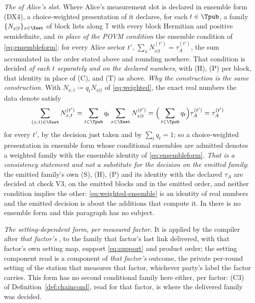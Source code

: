 \begin{definition}
\emph{The  of Alice's slot.} Where Alice's measurement slot
is declared in ensemble form (DX4), a choice-weighted presentation of it
declares, for each $t\in\Tpub$, a family $\{N_{x|t}\}_{x\in\Xset}$ of block
lists along $\mathbb{T}$ with every block Hermitian and positive
semidefinite, and \emph{in place of the POVM condition} the ensemble
condition of \eqref{eq:ensembleform}: for every Alice sector $t'$,
$\sum_{x}N^{(t')}_{x|t}=\tau^{(t')}_A$, the sum accumulated in the order
stated above and rounding nowhere. That condition is decided \emph{of each
$t$ separately and on the declared numbers}, with (H), (P) per block, that
identity in place of (C), and (T) as above. \emph{Why the
construction is the same construction.} With $N_{x,t}\coloneqq q_tN_{x|t}$ of
\eqref{eq:weighted}, the exact real numbers the data denote satisfy
\begin{equation}\label{eq:weighted-ensemble}
  \sum_{(x,t)\in\Vset}N^{(t')}_{x,t}
  =\sum_{t\in\Tpub}q_t\sum_{x\in\Xset}N^{(t')}_{x|t}
  =\Big(\sum_{t\in\Tpub}q_t\Big)\tau^{(t')}_A=\tau^{(t')}_A
\end{equation}
for every $t'$, by the decision just taken and by $\sum_tq_t=1$; so a
choice-weighted presentation in ensemble form whose conditional ensembles are
admitted denotes a weighted family with the ensemble identity of
\eqref{eq:ensembleform}. \emph{That is a consistency statement and not a
substitute for the decision on the emitted family}: the emitted family's own
(S), (H), (P) and its identity with the declared $\tau_A$ are decided at check
V3, on the emitted blocks and in the emitted order, and neither condition
implies the other: \eqref{eq:weighted-ensemble} is an identity of real
numbers and the emitted decision is about the additions that compute it. In
 there is no ensemble form and this paragraph has
no subject.

\emph{The setting-dependent form, per measured factor.} It is applied by the
compiler after \emph{that factor's} , to the family that
factor's last link delivered, with that factor's own setting map, support
\eqref{eq:support} and product order; the setting component read is a
component of \emph{that factor's} outcome, the private per-round setting of
the station that measures that factor, whichever party's label the factor
carries. This form has no second
conditional family here either, per factor: (C3) of
Definition~\ref{def:chaincond}, read for that factor, is where the delivered
family was decided.
\end{definition}
